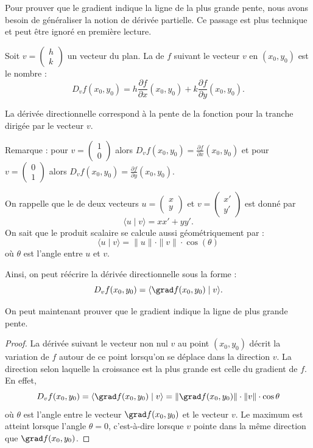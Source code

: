 \documentclass[11pt,class=report,crop=false]{standalone}
\begin{document}
Pour prouver que le gradient indique la ligne de la plus grande pente, nous avons besoin de généraliser la notion de dérivée partielle. Ce passage est plus technique et peut être ignoré en première lecture.

Soit $v=\left(\begin{smallmatrix}h\\k\end{smallmatrix}\right)$ un vecteur du plan.
La  de $f$ suivant le vecteur $v$ en $(x_0,y_0)$ est le nombre :
$$D_v f(x_0,y_0) = h\frac{\partial f}{\partial x}(x_0,y_0)
 +k\frac{\partial f}{\partial y}(x_0,y_0).$$
 
 
La dérivée directionnelle correspond à la pente de la fonction pour la tranche dirigée par le vecteur $v$.

 
Remarque : pour $v=\left(\begin{smallmatrix}1\\0\end{smallmatrix}\right)$
alors $D_v f(x_0,y_0) = \frac{\partial f}{\partial x}(x_0,y_0)$ et pour 
$v=\left(\begin{smallmatrix}0\\1\end{smallmatrix}\right)$
alors $D_v f(x_0,y_0) = \frac{\partial f}{\partial y}(x_0,y_0)$.


On rappelle que le  de deux vecteurs $u=\left(\begin{smallmatrix}x\\y\end{smallmatrix}\right)$ et 
$v=\left(\begin{smallmatrix}x'\\y'\end{smallmatrix}\right)$
est donné par 
$$\langle u \mid v \rangle = xx' + yy'.$$
On sait que le produit scalaire se calcule aussi géométriquement par :
$$\langle u \mid v \rangle = \|u\|\cdot \|v\| \cdot \cos(\theta)$$
où $\theta$ est l'angle entre $u$ et $v$.



Ainsi, on peut réécrire la dérivée directionnelle sous la forme :
$$D_v f(x_0,y_0) = \langle \grad f (x_0,y_0) \mid v \rangle.$$

 
On peut maintenant prouver que le gradient indique la ligne de plus grande pente.
 
\begin{proof}
La dérivée suivant le vecteur non nul $v$ au point $(x_0,y_0)$ décrit la variation de $f$ autour de ce point lorsqu'on se déplace dans la direction $v$. 
La direction selon laquelle la croissance est la plus grande est celle du gradient de $f$. En effet,
$$D_{v}f(x_0,y_0)=\langle \grad f(x_0,y_0) \mid v\rangle=
\| \grad f(x_0,y_0) \| \cdot \| v \| \cdot \cos \theta$$
où $\theta$ est l'angle entre le vecteur $\grad f(x_0,y_0)$ et le vecteur $v$.
Le maximum est atteint lorsque l'angle $\theta=0$, c'est-à-dire lorsque $v$ pointe dans la même direction que $\grad f(x_0,y_0)$.
\end{proof}
\end{document}

